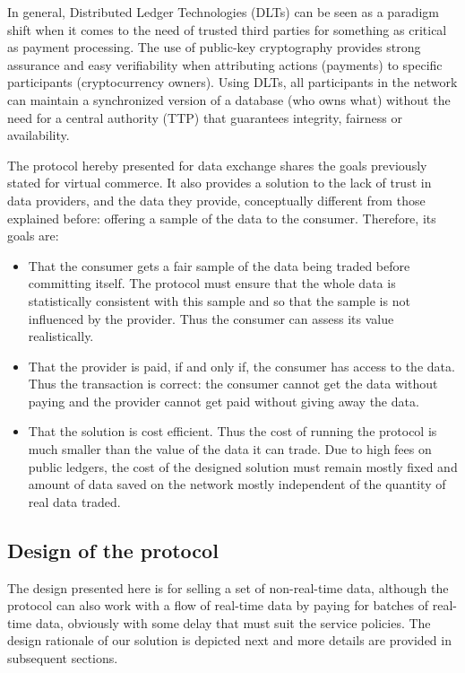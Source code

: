 \documentclass[]{article}
\begin{document}
	In general, Distributed Ledger Technologies (DLTs) can be seen as a paradigm shift when it comes to the need of trusted third parties for something as critical as payment processing. The use of public-key cryptography provides strong assurance and easy verifiability when attributing actions (payments) to specific participants (cryptocurrency owners). Using DLTs, all participants in the network can maintain a synchronized version of a database (who owns what) without the need for a central authority (TTP) that guarantees integrity, fairness or availability. 
	
	The protocol hereby presented for data exchange shares the goals previously stated for virtual commerce. It also provides a solution to the lack of trust in data providers, and the data they provide, conceptually different from those explained before: offering a sample of the data to the consumer. Therefore, its goals are:
	
	\begin{itemize}
		\item That the consumer gets a fair sample of the data being traded before committing itself. The protocol must ensure that the whole data is statistically consistent with this sample and so that the sample is not influenced by the provider. Thus the consumer can assess its value realistically.
		\item That the provider is paid, if and only if, the consumer has access to the data. Thus the transaction is correct: the consumer cannot get the data without paying and the provider cannot get paid without giving away the data.
		\item That the solution is cost efficient. Thus the cost of running the protocol is much smaller than the value of the data it can trade. Due to high fees on public ledgers, the cost of the designed solution must remain mostly fixed and amount of data saved on the network mostly independent of the quantity of real data traded.
	\end{itemize}

	\subsection{Design of the protocol}
	The design presented here is for selling a set of non-real-time data, although the protocol can also work with a flow of real-time data by paying for batches of real-time data, obviously with some delay that must suit the service policies. The design rationale of our solution is depicted next and more details are provided in subsequent sections.
\end{document}

